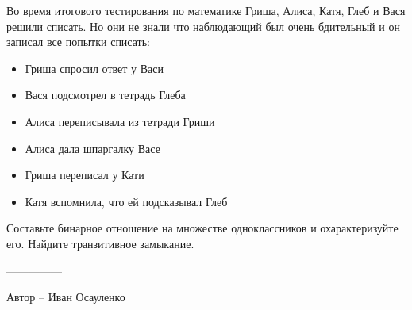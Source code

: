 \question
Во время итогового тестирования по математике Гриша, Алиса, Катя, Глеб и Вася решили списать. Но они не знали что наблюдающий был очень бдительный и он записал все попытки списать:

\begin{itemize}
  \item Гриша спросил ответ у Васи
  \item Вася подсмотрел в тетрадь Глеба
  \item Алиса переписывала из тетради Гриши
  \item Алиса дала шпаргалку Васе
  \item Гриша переписал у Кати
  \item Катя вспомнила, что ей подсказывал Глеб
\end{itemize}

Составьте бинарное отношение на множестве одноклассников и охарактеризуйте его. Найдите транзитивное замыкание.

---------------

Автор -- Иван Осауленко
